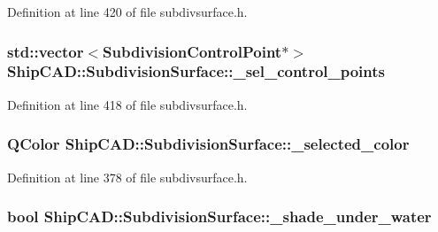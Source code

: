 Definition at line 420 of file subdivsurface.\-h.

\hypertarget{classShipCAD_1_1SubdivisionSurface_aefa02ffcdf17a06acd80f4274e509981}{
\subsubsection[{\-\_\-sel\-\_\-control\-\_\-points}]{\setlength{\rightskip}{0pt plus 5cm}std\-::vector$<${\bf Subdivision\-Control\-Point}$\ast$$>$ Ship\-C\-A\-D\-::\-Subdivision\-Surface\-::\-\_\-sel\-\_\-control\-\_\-points\hspace{0.3cm}{\ttfamily [protected]}}}\label{classShipCAD_1_1SubdivisionSurface_aefa02ffcdf17a06acd80f4274e509981}


Definition at line 418 of file subdivsurface.\-h.

\hypertarget{classShipCAD_1_1SubdivisionSurface_a3cfcbbe769216c753330f71e57a4cf4d}{
\subsubsection[{\-\_\-selected\-\_\-color}]{\setlength{\rightskip}{0pt plus 5cm}Q\-Color Ship\-C\-A\-D\-::\-Subdivision\-Surface\-::\-\_\-selected\-\_\-color\hspace{0.3cm}{\ttfamily [protected]}}}\label{classShipCAD_1_1SubdivisionSurface_a3cfcbbe769216c753330f71e57a4cf4d}


Definition at line 378 of file subdivsurface.\-h.

\hypertarget{classShipCAD_1_1SubdivisionSurface_ac3294d41679de31e588d603e3428565e}{
\subsubsection[{\-\_\-shade\-\_\-under\-\_\-water}]{\setlength{\rightskip}{0pt plus 5cm}bool Ship\-C\-A\-D\-::\-Subdivision\-Surface\-::\-\_\-shade\-\_\-under\-\_\-water\hspace{0.3cm}{\ttfamily [protected]}}}\label{classShipCAD_1_1SubdivisionSurface_ac3294d41679de31e588d603e3428565e}


